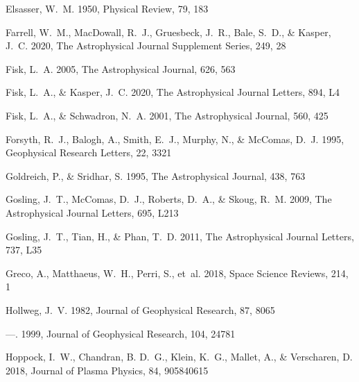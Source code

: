 \documentclass[]{aastex62}
\begin{document}
\begin{thebibliography}{}
{Elsasser}, W.~M. 1950, Physical Review, 79, 183

{Farrell}, W.~M., {MacDowall}, R.~J., {Gruesbeck}, J.~R., {Bale}, S.~D., \&
  {Kasper}, J.~C. 2020, The Astrophysical Journal Supplement Series, 249, 28

{Fisk}, L.~A. 2005, The Astrophysical Journal, 626, 563

{Fisk}, L.~A., \& {Kasper}, J.~C. 2020, The Astrophysical Journal Letters, 894,
  L4

{Fisk}, L.~A., \& {Schwadron}, N.~A. 2001, The Astrophysical Journal, 560, 425

{Forsyth}, R.~J., {Balogh}, A., {Smith}, E.~J., {Murphy}, N., \& {McComas},
  D.~J. 1995, Geophysical Research Letters, 22, 3321

Goldreich, P., \& Sridhar, S. 1995, The Astrophysical Journal, 438, 763

{Gosling}, J.~T., {McComas}, D.~J., {Roberts}, D.~A., \& {Skoug}, R.~M. 2009,
  The Astrophysical Journal Letters, 695, L213

{Gosling}, J.~T., {Tian}, H., \& {Phan}, T.~D. 2011, The Astrophysical Journal
  Letters, 737, L35

{Greco}, A., {Matthaeus}, W.~H., {Perri}, S., {et~al.} 2018, Space Science
  Reviews, 214, 1

{Hollweg}, J.~V. 1982, Journal of Geophysical Research, 87, 8065

---. 1999, Journal of Geophysical Research, 104, 24781

Hoppock, I.~W., Chandran, B. D.~G., Klein, K.~G., Mallet, A., \& Verscharen, D.
  2018, Journal of Plasma Physics, 84, 905840615


\end{thebibliography}
\end{document}
